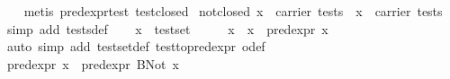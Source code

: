 \begin{isabellebody}
%
\isadelimproof
\ \ %
\endisadelimproof
%
\isatagproof
{}\isamarkupfalse%
\ {}metis\ pred{}expr{}test\ test{}closed{}%
\endisatagproof
{\isafoldproof}%
%
\isadelimproof
\isanewline
%
\endisadelimproof
\isanewline
{}\isamarkupfalse%
\ not{}closed{}\ {}x\ {}\ carrier\ tests\ {}\ {}x\ {}\ carrier\ tests{}\isanewline
%
\isadelimproof
%
\endisadelimproof
%
\isatagproof
{}\isamarkupfalse%
\ {}simp\ add{}\ tests{}def{}\isanewline
\ \ \isamarkupfalse%
\ {}x\ {}\ test{}set{}\isanewline
\ \ \isamarkupfalse%
\ \isamarkupfalse%
\ x{}\ \ {}x\ {}\ pred{}expr\ x{}{}\isanewline
\ \ \ \ \isamarkupfalse%
\ {}auto\ simp\ add{}\ test{}set{}def\ test{}to{}pred{}expr\ o{}def{}\isanewline
\ \ \isamarkupfalse%
\ {}{}{}pred{}expr\ x{}{}\ {}\ pred{}expr\ {}BNot\ x{}{}{}\isanewline

\end{isabellebody}
